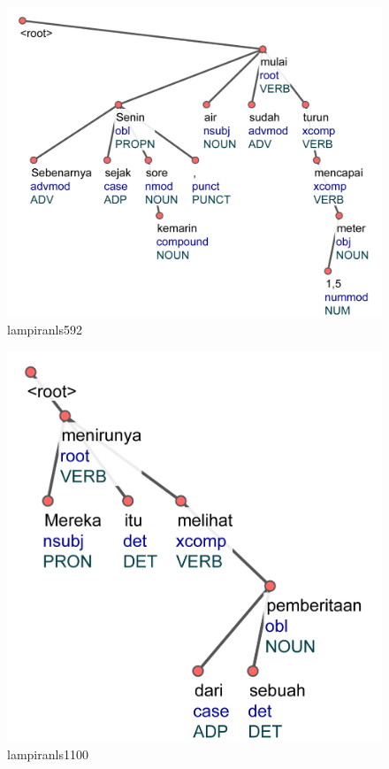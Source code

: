 \begin{figure}
	\centering \includegraphics[width=0.8
	\textwidth] {pics/lampiran/lampiranls592.jpg} 
	\caption{lampiranls592} 
	\label{fig:lampiranls592} 
\end{figure}

\begin{figure}
	\centering \includegraphics[width=0.8
	\textwidth] {pics/lampiran/lampiranls1100.jpg} 
	\caption{lampiranls1100} 
	\label{fig:lampiranls1100} 
\end{figure}

